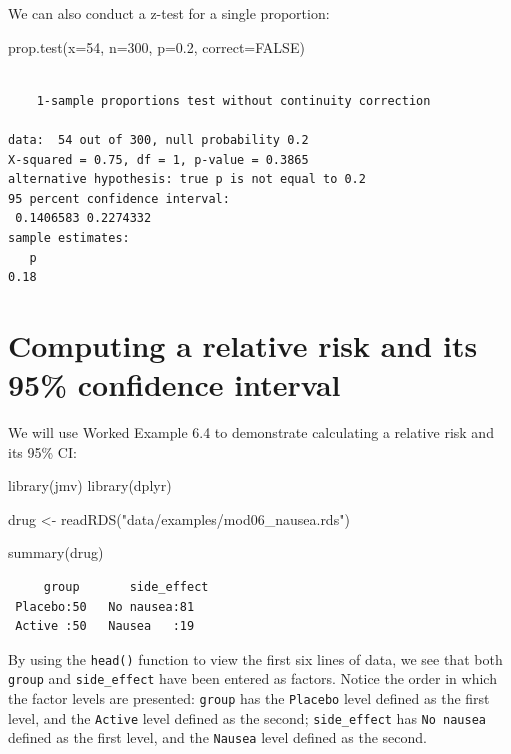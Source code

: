 \documentclass[
  a4paper,
]{memoir}
\newenvironment{Shaded}{\begin{snugshade}}{\end{snugshade}}
\newcommand{\AttributeTok}[1]{\textcolor[rgb]{0.00,0.00,0.00}{#1}}
\newcommand{\ConstantTok}[1]{\textcolor[rgb]{0.00,0.00,0.00}{#1}}
\newcommand{\DecValTok}[1]{\textcolor[rgb]{0.00,0.00,0.00}{#1}}
\newcommand{\FloatTok}[1]{\textcolor[rgb]{0.00,0.00,0.00}{#1}}
\newcommand{\FunctionTok}[1]{\textcolor[rgb]{0.00,0.00,0.00}{#1}}
\newcommand{\NormalTok}[1]{\textcolor[rgb]{0.00,0.00,0.00}{#1}}
\newcommand{\OtherTok}[1]{\textcolor[rgb]{0.00,0.00,0.00}{#1}}
\newcommand{\StringTok}[1]{\textcolor[rgb]{0.00,0.00,0.00}{#1}}
\begin{document}
We can also conduct a z-test for a single proportion:

\begin{Shaded}
\begin{Highlighting}[]
\FunctionTok{prop.test}\NormalTok{(}\AttributeTok{x=}\DecValTok{54}\NormalTok{, }\AttributeTok{n=}\DecValTok{300}\NormalTok{, }\AttributeTok{p=}\FloatTok{0.2}\NormalTok{, }\AttributeTok{correct=}\ConstantTok{FALSE}\NormalTok{)}
\end{Highlighting}
\end{Shaded}

\begin{verbatim}

    1-sample proportions test without continuity correction

data:  54 out of 300, null probability 0.2
X-squared = 0.75, df = 1, p-value = 0.3865
alternative hypothesis: true p is not equal to 0.2
95 percent confidence interval:
 0.1406583 0.2274332
sample estimates:
   p 
0.18 
\end{verbatim}

\section{Computing a relative risk and its 95\% confidence
interval}\label{computing-a-relative-risk-and-its-95-confidence-interval-1}

We will use Worked Example 6.4 to demonstrate calculating a relative
risk and its 95\% CI:

\begin{Shaded}
\begin{Highlighting}[]
\FunctionTok{library}\NormalTok{(jmv)}
\FunctionTok{library}\NormalTok{(dplyr)}

\NormalTok{drug }\OtherTok{\textless{}{-}} \FunctionTok{readRDS}\NormalTok{(}\StringTok{"data/examples/mod06\_nausea.rds"}\NormalTok{)}

\FunctionTok{summary}\NormalTok{(drug)}
\end{Highlighting}
\end{Shaded}

\begin{verbatim}
     group       side_effect
 Placebo:50   No nausea:81  
 Active :50   Nausea   :19  
\end{verbatim}

By using the \texttt{head()} function to view the first six lines of
data, we see that both \texttt{group} and \texttt{side\_effect} have
been entered as factors. Notice the order in which the factor levels are
presented: \texttt{group} has the \texttt{Placebo} level defined as the
first level, and the \texttt{Active} level defined as the second;
\texttt{side\_effect} has \texttt{No\ nausea} defined as the first
level, and the \texttt{Nausea} level defined as the second.
\end{document}
